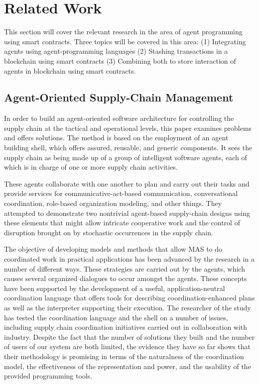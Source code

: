 \ifx\doclanguage\english
\chapter{Related Work}

This section will cover the relevant research in the area of agent programming using smart contracts. Three topics will be covered in this area: (1) Integrating agents using agent-programming languages (2) Stashing transactions in a blockchain using smart contracts (3) Combining both to store interaction of agents in blockchain using smart contracts.

\section{Agent-Oriented Supply-Chain Management}

In order to build an agent-oriented software architecture for controlling the supply chain at the tactical and operational levels, this paper \cite{agSupch} examines problems and offers solutions. The method is based on the employment of an agent building shell, which offers assured, reusable, and generic components. It sees the supply chain as being made up of a group of intelligent software agents, each of which is in charge of one or more supply chain activities. 

\vspace{.5cm}

These agents collaborate with one another to plan and carry out their tasks and provide services for communicative-act-based communication, conversational coordination, role-based organization modeling, and other things. They attempted to demonstrate two nontrivial agent-based supply-chain designs using these elements that might allow intricate cooperative work and the control of disruption brought on by stochastic occurrences in the supply chain.

\vspace{.5cm}

The objective of developing models and methods that allow \ac{MAS} to do coordinated work in practical applications has been advanced by the research in a number of different ways. These strategies are carried out by the agents, which causes several organized dialogues to occur amongst the agents. These concepts have been supported by the development of a useful, application-neutral coordination language that offers tools for describing coordination-enhanced plans as well as the interpreter supporting their execution. The researcher of the study has tested the coordination language and the shell on a number of issues, including supply chain coordination initiatives carried out in collaboration with industry. Despite the fact that the number of solutions they built and the number of users of our system are both limited, the evidence they have so far shows that their methodology is promising in terms of the naturalness of the coordination model, the effectiveness of the representation and power, and the usability of the provided programming tools.

